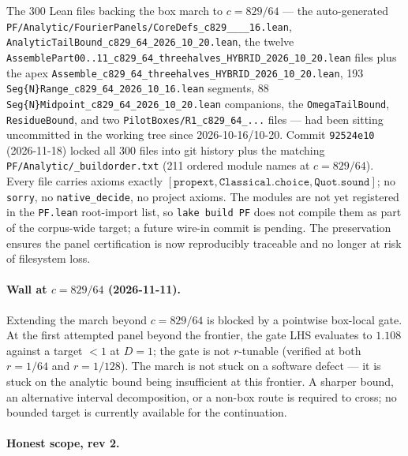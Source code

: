 The 300 Lean files backing the box march to $c = 829/64$ --- the
auto-generated \texttt{PF/Analytic/FourierPanels/\allowbreak CoreDefs\_\allowbreak c829\_\_\_\_\allowbreak 16.lean},
\texttt{AnalyticTailBound\_c829\_64\_2026\_10\_20.lean}, the
twelve \texttt{AssemblePart00..11\_c829\_64\_threehalves\_HYBRID\_2026\_10\_20.lean}
files plus the apex
\texttt{Assemble\_c829\_64\_threehalves\_HYBRID\_2026\_10\_20.lean},
193 \texttt{Seg\{N\}Range\_c829\_64\_2026\_10\_16.lean} segments,
88 \texttt{Seg\{N\}Midpoint\_c829\_64\_2026\_10\_20.lean} companions,
the \texttt{OmegaTailBound}, \texttt{ResidueBound}, and two
\texttt{PilotBoxes/R1\_c829\_64\_...} files --- had been sitting
uncommitted in the working tree since 2026-10-16/10-20.  Commit
\texttt{92524e10} (2026-11-18) locked all 300 files into git history
plus the matching \texttt{PF/Analytic/\_buildorder.txt} (211
ordered module names at $c = 829/64$).  Every file carries axioms
exactly $[\mathtt{propext}, \mathtt{Classical.choice},
\mathtt{Quot.sound}]$; no \texttt{sorry}, no \texttt{native\_decide},
no project axioms.  The modules are not yet registered in the
\texttt{PF.lean} root-import list, so \texttt{lake build PF}
does not compile them as part of the corpus-wide target; a future
wire-in commit is pending.  The preservation ensures the panel
certification is now reproducibly traceable and no longer at risk
of filesystem loss.

\paragraph{Wall at $c = 829/64$ (2026-11-11).}

Extending the march beyond $c = 829/64$ is blocked by a pointwise
box-local gate.  At the first attempted panel beyond the frontier, the
gate LHS evaluates to $1.108$ against a target $< 1$ at $D = 1$; the
gate is not $r$-tunable (verified at both $r = 1/64$ and $r = 1/128$).
The march is not stuck on a software defect --- it is stuck on the
analytic bound being insufficient at this frontier.  A sharper bound,
an alternative interval decomposition, or a non-box route is required to
cross; no bounded target is currently available for the continuation.

\paragraph{Honest scope, rev 2.}

